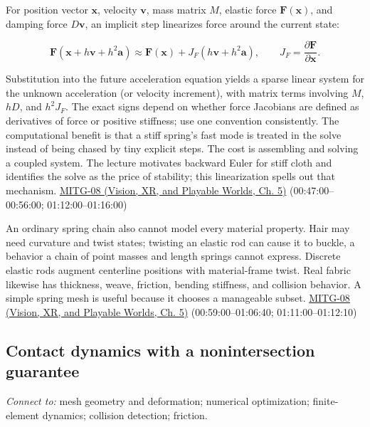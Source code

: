 For position vector \(\boldsymbol{x}\), velocity \(\boldsymbol{v}\), mass matrix \(M\), elastic force \(\boldsymbol{F}(\boldsymbol{x})\), and damping force \(D\boldsymbol{v}\), an implicit step linearizes force around the current state:

\[
\boldsymbol{F}(\boldsymbol{x}+h\boldsymbol{v}+h^2\boldsymbol{a})
\approx \boldsymbol{F}(\boldsymbol{x})
+J_F(h\boldsymbol{v}+h^2\boldsymbol{a}),
\qquad J_F=\frac{\partial \boldsymbol{F}}{\partial \boldsymbol{x}}.
\]

Substitution into the future acceleration equation yields a sparse linear system for the unknown acceleration (or velocity increment), with matrix terms involving \(M\), \(hD\), and \(h^2J_F\). The exact signs depend on whether force Jacobians are defined as derivatives of force or positive stiffness; use one convention consistently. The computational benefit is that a stiff spring's fast mode is treated in the solve instead of being chased by tiny explicit steps. The cost is assembling and solving a coupled system. The lecture motivates backward Euler for stiff cloth and identifies the solve as the price of stability; this linearization spells out that mechanism. \href{../07-Vision-XR-and-Playable-Worlds/main.pdf\#nameddest=04-visual-computing-ii-ch036-mitg-08---cloth-simulation}{MITG-08 (Vision, XR, and Playable Worlds, Ch. 5)} (00:47:00--00:56:00; 01:12:00--01:16:00)

An ordinary spring chain also cannot model every material property. Hair may need curvature and twist states; twisting an elastic rod can cause it to buckle, a behavior a chain of point masses and length springs cannot express. Discrete elastic rods augment centerline positions with material-frame twist. Real fabric likewise has thickness, weave, friction, bending stiffness, and collision behavior. A simple spring mesh is useful because it chooses a manageable subset. \href{../07-Vision-XR-and-Playable-Worlds/main.pdf\#nameddest=04-visual-computing-ii-ch036-mitg-08---cloth-simulation}{MITG-08 (Vision, XR, and Playable Worlds, Ch. 5)} (00:59:00--01:06:40; 01:11:00--01:12:10)

\subsection{Contact dynamics with a nonintersection guarantee}\label{04-visual-computing-ii-ch029-contact-dynamics-with-a-nonintersection-guarantee}

\emph{Connect to:} mesh geometry and deformation; numerical optimization; finite-element dynamics; collision detection; friction.

